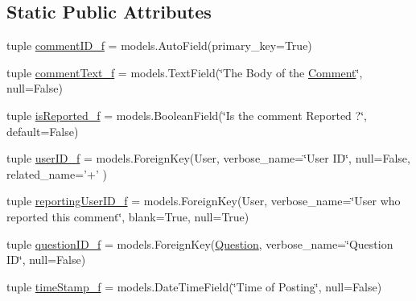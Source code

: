 \subsection*{Static Public Attributes}
\begin{DoxyCompactItemize}
\item 
tuple \hyperlink{class_ecodena_1_1_comment_1_1models_1_1_comment_aa6f9647f3c5bc90f1d4b3c71e91b1851}{commentID\_\-f} = models.AutoField(primary\_\-key=True)
\item 
tuple \hyperlink{class_ecodena_1_1_comment_1_1models_1_1_comment_a808da2fbfcfee13f0474d8d929b17181}{commentText\_\-f} = models.TextField(\char`\"{}The Body of the \hyperlink{class_ecodena_1_1_comment_1_1models_1_1_comment}{Comment}\char`\"{}, null=False)
\item 
tuple \hyperlink{class_ecodena_1_1_comment_1_1models_1_1_comment_ac146541041d0391dbe6820b161d3d467}{isReported\_\-f} = models.BooleanField(\char`\"{}Is the comment Reported ?\char`\"{}, default=False)
\item 
tuple \hyperlink{class_ecodena_1_1_comment_1_1models_1_1_comment_aabc6fe0feb8814bacc07dced3de8e401}{userID\_\-f} = models.ForeignKey(User, verbose\_\-name=\char`\"{}User ID\char`\"{}, null=False, related\_\-name='+' )
\item 
tuple \hyperlink{class_ecodena_1_1_comment_1_1models_1_1_comment_a8eec9726cc1a3667ec0808b1678ce93e}{reportingUserID\_\-f} = models.ForeignKey(User, verbose\_\-name=\char`\"{}User who reported this comment\char`\"{}, blank=True, null=True)
\item 
tuple \hyperlink{class_ecodena_1_1_comment_1_1models_1_1_comment_a2c6b11a35fd421d384666c0b79a20c47}{questionID\_\-f} = models.ForeignKey(\hyperlink{class_ecodena_1_1_question_1_1models_1_1_question}{Question}, verbose\_\-name=\char`\"{}Question ID\char`\"{}, null=False)
\item 
tuple \hyperlink{class_ecodena_1_1_comment_1_1models_1_1_comment_aaaea3223dc455aa4dd3de1e74581e88e}{timeStamp\_\-f} = models.DateTimeField(\char`\"{}Time of Posting\char`\"{}, null=False)
\end{DoxyCompactItemize}
